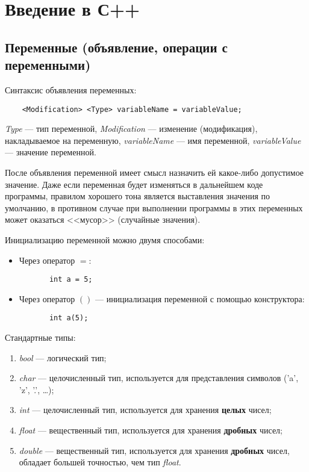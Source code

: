 \section{Введение в С++}

\subsection{Переменные (объявление, операции с переменными)}

Синтаксис объявления переменных:
\lstset{style=CPlusPlus}
\begin{lstlisting}
    <Modification> <Type> variableName = variableValue;
\end{lstlisting}

\textit{Type} --- тип переменной, \textit{Modification} --- изменение (модификация), накладываемое на переменную, \textit{variableName} --- имя переменной, \textit{variableValue} --- значение переменной.
 
После объявления переменной имеет смысл назначить ей какое-либо допустимое значение. Даже если переменная будет изменяться в дальнейшем коде программы, правилом хорошего тона является выставления значения по умолчанию, в противном случае при выполнении программы в этих переменных может оказаться <<мусор>> (случайные значения).

Инициализацию переменной можно двумя способами:
\begin{itemize}
    \item Через оператор $=$:
    \begin{lstlisting}
       int a = 5;
    \end{lstlisting}
    \item Через оператор $()$ --- инициализация переменной с помощью конструктора:
    \lstset{style=CPlusPlus}
    \begin{lstlisting}
       int a(5);
    \end{lstlisting}
\end{itemize}

Стандартные типы:
\begin{enumerate}
    \item \textit{bool} --- логический тип;
    \item \textit{char} --- целочисленный тип, используется для представления символов ('a', 'z', '.', \ldots);
    \item \textit{int} --- целочисленный тип, используется для хранения \textbf{целых} чисел;
    \item \textit{float} --- вещественный тип, используется для хранения \textbf{дробных} чисел;
    \item \textit{double} --- вещественный тип, используется для хранения \textbf{дробных} чисел, обладает большей точностью, чем тип \textit{float}.
\end{enumerate}

